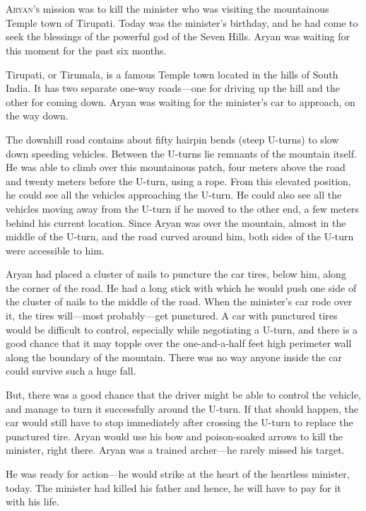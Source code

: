 
\chapter{}

\lettrine{A}{ryan's} mission was to kill the minister who was visiting the
mountainous Temple town of Tirupati. Today was the minister's birthday, and he
had come to seek the blessings of the powerful god of the Seven Hills. Aryan was
waiting for this moment for the past six months.

Tirupati, or Tirumala, is a famous Temple town located in the hills of South
India. It has two separate one-way roads—one for driving up the hill
and the other for coming down. Aryan was waiting for the minister's car to
approach, on the way down.

The downhill road contains about fifty hairpin bends (steep U-turns) to slow down
speeding vehicles. Between the U-turns lie remnants of the mountain itself.
He was able to climb over this mountainous patch, four meters above the road and
twenty meters before the U-turn, using a rope. From this elevated position, he
could see all the vehicles approaching the U-turn. He could also see all the
vehicles moving away from the U-turn if he moved to the other end, a few
meters behind his current location. Since Aryan was over the mountain, almost in
the middle of the U-turn, and the road curved around him, both sides of the
U-turn were accessible to him.

Aryan had placed a cluster of nails to puncture the car tires, below him, along
the corner of the road. He had a long stick with which he would push one side of
the cluster of nails to the middle of the road. When the minister's car rode
over it, the tires will—most probably—get punctured. A car with punctured
tires would be difficult to control, especially while negotiating a U-turn, and
there is a good chance that it may topple over the one-and-a-half feet high
perimeter wall along the boundary of the mountain. There was no way anyone
inside the car could survive such a huge fall.

But, there was a good chance that the driver might be able to control the
vehicle, and manage to turn it successfully around the U-turn. If that
should happen, the car would still have to stop immediately after crossing the
U-turn to replace the punctured tire. Aryan would use his bow and
poison-soaked arrows to kill the minister, right there. Aryan was a trained
archer—he rarely missed his target.

He was ready for action—he would strike at the heart of the heartless minister,
today. The minister had killed his father and hence, he will have to pay for it
with his life.

